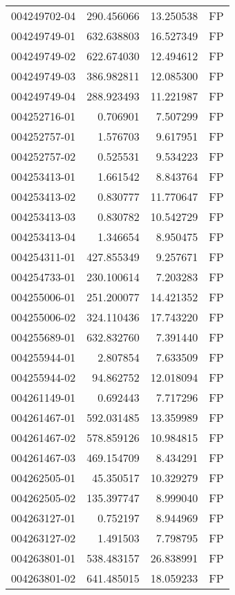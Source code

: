 \begin{tabular}{lrrl}
004249702-04 &  290.456066 &    13.250538 &   FP \\
004249749-01 &  632.638803 &    16.527349 &   FP \\
004249749-02 &  622.674030 &    12.494612 &   FP \\
004249749-03 &  386.982811 &    12.085300 &   FP \\
004249749-04 &  288.923493 &    11.221987 &   FP \\
004252716-01 &    0.706901 &     7.507299 &   FP \\
004252757-01 &    1.576703 &     9.617951 &   FP \\
004252757-02 &    0.525531 &     9.534223 &   FP \\
004253413-01 &    1.661542 &     8.843764 &   FP \\
004253413-02 &    0.830777 &    11.770647 &   FP \\
004253413-03 &    0.830782 &    10.542729 &   FP \\
004253413-04 &    1.346654 &     8.950475 &   FP \\
004254311-01 &  427.855349 &     9.257671 &   FP \\
004254733-01 &  230.100614 &     7.203283 &   FP \\
004255006-01 &  251.200077 &    14.421352 &   FP \\
004255006-02 &  324.110436 &    17.743220 &   FP \\
004255689-01 &  632.832760 &     7.391440 &   FP \\
004255944-01 &    2.807854 &     7.633509 &   FP \\
004255944-02 &   94.862752 &    12.018094 &   FP \\
004261149-01 &    0.692443 &     7.717296 &   FP \\
004261467-01 &  592.031485 &    13.359989 &   FP \\
004261467-02 &  578.859126 &    10.984815 &   FP \\
004261467-03 &  469.154709 &     8.434291 &   FP \\
004262505-01 &   45.350517 &    10.329279 &   FP \\
004262505-02 &  135.397747 &     8.999040 &   FP \\
004263127-01 &    0.752197 &     8.944969 &   FP \\
004263127-02 &    1.491503 &     7.798795 &   FP \\
004263801-01 &  538.483157 &    26.838991 &   FP \\
004263801-02 &  641.485015 &    18.059233 &   FP \\

\end{tabular}
